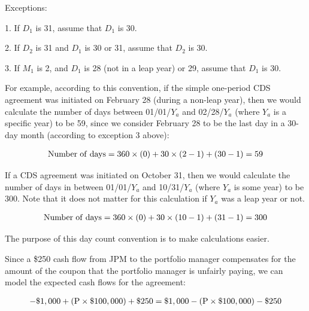 \documentclass{jss}
\begin{document}
Exceptions:

1. If $D_1$ is 31, assume that $D_1$ is 30.

2. If $D_2$ is 31 and $D_1$ is 30 or 31, assume that $D_2$ is 30.

3. If $M_1$ is 2, and $D_1$ is 28 (not in a leap year) or 29, assume that $D_1$ is 30.

For example, according to this convention, if the simple one-period CDS agreement was initiated on February 28 (during a non-leap year), then we would calculate the number of days between 01/01/$Y_a$ and 02/28/$Y_a$ (where $Y_a$ is a specific year) to be 59, since we consider February 28 to be the last day in a 30-day month (according to exception 3 above):

\begin{equation}
 \begin{aligned}
  {\rm Number\hspace{3pt}of\hspace{3pt}days = 360 \times (0) + 30 \times (2 - 1) + (30 - 1) = 59}
    \end{aligned}
\end{equation}

If a CDS agreement was initiated on October 31, then we would calculate the number of days in between 01/01/$Y_a$ and 10/31/$Y_a$ (where $Y_a$ is some year) to be 300. Note that it does not matter for this calculation if $Y_a$ was a leap year or not.

\begin{equation}
 \begin{aligned}
  {\rm Number\hspace{3pt}of\hspace{3pt}days = 360 \times (0) + 30 \times (10 - 1) + (31 - 1) = 300}
    \end{aligned}
\end{equation}

The purpose of this day count convention is to make calculations easier.

Since a \$250 cash flow from JPM to the portfolio manager compensates for the amount of the coupon that the portfolio manager is unfairly paying, we can model the expected cash flows for the agreement:

\begin{equation}
 \begin{aligned}
   {\rm - \$1,000 + (P \times \$100,000) + \$250 = \$1,000 - (P \times \$100,000) - \$250}
    \end{aligned}
\end{equation}
\end{document}
